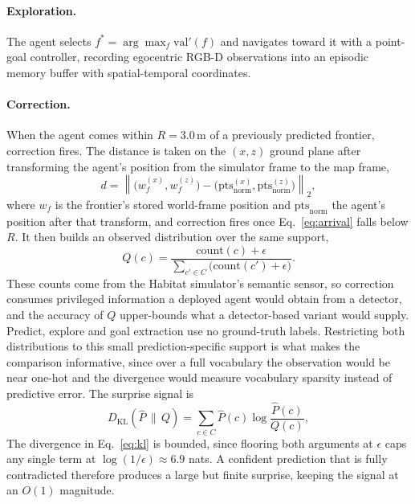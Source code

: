 \paragraph{Exploration.} The agent selects $f^* = \arg\max_f \mathrm{val}'(f)$ and navigates toward it with a point-goal controller, recording egocentric RGB-D observations into an episodic memory buffer with spatial-temporal coordinates.

\paragraph{Correction.} When the agent comes within $R = 3.0$\,m of a previously predicted frontier, correction fires. The distance is taken on the $(x,z)$ ground plane after transforming the agent's position from the simulator frame to the map frame,
\begin{equation}
    d = \left\lVert \big(w_f^{(x)}, w_f^{(z)}\big) - \big(\mathrm{pts}_{\text{norm}}^{(x)}, \mathrm{pts}_{\text{norm}}^{(z)}\big) \right\rVert_2 ,
    \label{eq:arrival}
\end{equation}
where $w_f$ is the frontier's stored world-frame position and $\mathrm{pts}_{\text{norm}}$ the agent's position after that transform, and correction fires once Eq.~\ref{eq:arrival} falls below $R$. It then builds an observed distribution over the same support,
\begin{equation}
    Q(c) = \frac{\mathrm{count}(c) + \epsilon}{\sum_{c' \in C} \big(\mathrm{count}(c') + \epsilon\big)} .
    \label{eq:observed}
\end{equation}
These counts come from the Habitat simulator's semantic sensor, so correction consumes privileged information a deployed agent would obtain from a detector, and the accuracy of $Q$ upper-bounds what a detector-based variant would supply. Predict, explore and goal extraction use no ground-truth labels. Restricting both distributions to this small prediction-specific support is what makes the comparison informative, since over a full vocabulary the observation would be near one-hot and the divergence would measure vocabulary sparsity instead of predictive error. The surprise signal is
\begin{equation}
    D_{\mathrm{KL}}(\hat{P} \,\|\, Q) = \sum_{c \in C} \hat{P}(c) \log \frac{\hat{P}(c)}{Q(c)} ,
    \label{eq:kl}
\end{equation}
The divergence in Eq.~\ref{eq:kl} is bounded, since flooring both arguments at $\epsilon$ caps any single term at $\log(1/\epsilon) \approx 6.9$ nats. A confident prediction that is fully contradicted therefore produces a large but finite surprise, keeping the signal at an $O(1)$ magnitude.

